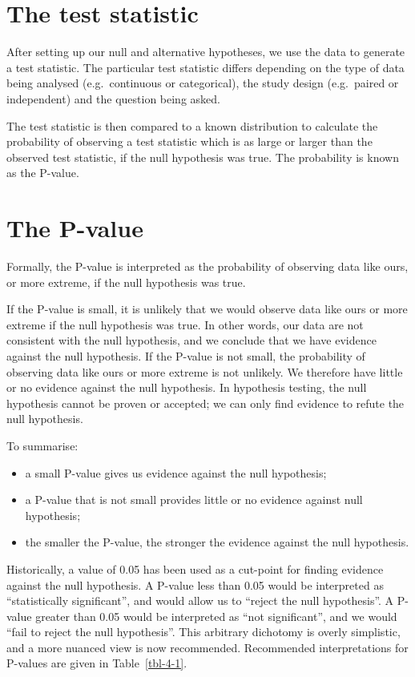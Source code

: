 \documentclass[
  a4paper,
]{memoir}
\providecommand{\tightlist}{%
  \setlength{\itemsep}{0pt}\setlength{\parskip}{0pt}}
\begin{document}
\section{The test statistic}\label{the-test-statistic}

After setting up our null and alternative hypotheses, we use the data to
generate a test statistic. The particular test statistic differs
depending on the type of data being analysed (e.g.~continuous or
categorical), the study design (e.g.~paired or independent) and the
question being asked.

The test statistic is then compared to a known distribution to calculate
the probability of observing a test statistic which is as large or
larger than the observed test statistic, if the null hypothesis was
true. The probability is known as the P-value.

\section{The P-value}\label{the-p-value}

Formally, the P-value is interpreted as the probability of observing
data like ours, or more extreme, if the null hypothesis was true.

If the P-value is small, it is unlikely that we would observe data like
ours or more extreme if the null hypothesis was true. In other words,
our data are not consistent with the null hypothesis, and we conclude
that we have evidence against the null hypothesis. If the P-value is not
small, the probability of observing data like ours or more extreme is
not unlikely. We therefore have little or no evidence against the null
hypothesis. In hypothesis testing, the null hypothesis cannot be proven
or accepted; we can only find evidence to refute the null hypothesis.

To summarise:

\begin{itemize}
\tightlist
\item
  a small P-value gives us evidence against the null hypothesis;
\item
  a P-value that is not small provides little or no evidence against
  null hypothesis;
\item
  the smaller the P-value, the stronger the evidence against the null
  hypothesis.
\end{itemize}

Historically, a value of 0.05 has been used as a cut-point for finding
evidence against the null hypothesis. A P-value less than 0.05 would be
interpreted as ``statistically significant'', and would allow us to
``reject the null hypothesis''. A P-value greater than 0.05 would be
interpreted as ``not significant'', and we would ``fail to reject the
null hypothesis''. This arbitrary dichotomy is overly simplistic, and a
more nuanced view is now recommended. Recommended interpretations for
P-values are given in Table~\ref{tbl-4-1}.
\end{document}
